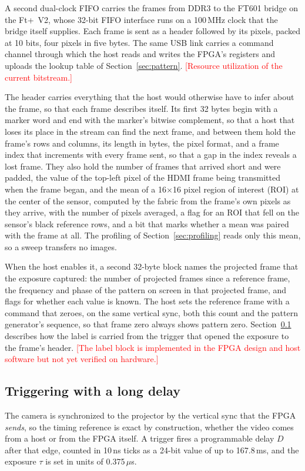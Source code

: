 \documentclass[10pt,journal,compsoc]{IEEEtran}
\newcommand{\SI}[2]{#1\,#2}
\newcommand{\micro}{\ensuremath{\mu}}
\newcommand{\nano}{n}\newcommand{\milli}{m}\newcommand{\mega}{M}
\newcommand{\second}{s}\newcommand{\hertz}{Hz}\newcommand{\metre}{m}
\newcommand{\pending}[1]{\textcolor{red}{[#1]}}
\begin{document}
A second dual-clock FIFO carries the frames from DDR3 to the FT601 bridge on the Ft+~V2, whose
32-bit FIFO interface runs on a \SI{100}{\mega\hertz} clock that the bridge itself supplies. Each
frame is sent as a header followed by its pixels, packed at 10 bits, four pixels in five bytes.
The same USB link carries a command channel through which the host reads and writes the FPGA's
registers and uploads the lookup table of Section~\ref{sec:pattern}. \pending{Resource
utilization of the current bitstream.}

The header carries everything that the host would otherwise have to infer about the frame, so
that each frame describes itself. Its first 32 bytes begin with a marker word and end with the
marker's bitwise complement, so that a host that loses its place in the stream can find the next
frame, and between them hold the frame's rows and columns, its length in bytes, the pixel
format, and a frame index that increments with every frame sent, so that a gap in the index
reveals a lost frame. They also hold the number of frames that arrived short and were padded,
the value of the top-left pixel of the HDMI frame being transmitted when the frame began, and the
mean of a 16$\times$16 pixel region of interest (ROI) at the center of the sensor, computed by the
fabric from the frame's own pixels as they arrive, with the number of pixels averaged, a flag for
an ROI that fell on the sensor's black reference rows, and a bit that marks whether a mean was
paired with the frame at all. The profiling of Section~\ref{sec:profiling} reads only this mean,
so a sweep transfers no images.

When the host enables it, a second 32-byte block names the projected frame that the exposure
captured: the number of projected frames since a reference frame, the frequency and phase of the
pattern on screen in that projected frame, and flags for whether each value is known. The host sets the reference frame with a command that zeroes, on the same vertical sync,
both this count and the pattern generator's sequence, so that frame zero always shows pattern
zero. Section~\ref{sec:stacking} describes how the label is carried from the trigger that opened
the exposure to the frame's header. \pending{The label block is implemented in the FPGA design
and host software but not yet verified on hardware.}

\subsection{Triggering with a long delay}
\label{sec:stacking}
The camera is synchronized to the projector by the vertical sync that the FPGA \emph{sends}, so
the timing reference is exact by construction, whether the video comes from a host or from the
FPGA itself. A trigger fires a programmable delay $D$ after that edge, counted in
\SI{10}{\nano\second} ticks as a 24-bit value of up to \SI{167.8}{\milli\second}, and the exposure $\tau$ is set in units of
\SI{0.375}{\micro\second}.
\end{document}
